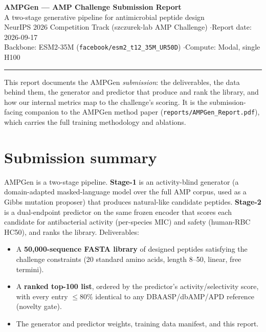 \documentclass[11pt]{article}
\begin{document}
\begin{center}
{\LARGE\bfseries AMPGen --- AMP Challenge Submission Report}\\[4pt]
{\large A two-stage generative pipeline for antimicrobial peptide design}\\[6pt]
{\normalsize NeurIPS 2026 Competition Track (szczurek-lab AMP Challenge) \quad$\cdot$\quad Report date: 2026-09-17}\\[2pt]
{\small Backbone: ESM2-35M (\texttt{facebook/esm2\_t12\_35M\_UR50D}) \quad$\cdot$\quad Compute: Modal, single H100}
\end{center}
\vspace{2pt}
\hrule
\vspace{6pt}

This report documents the AMPGen \emph{submission}: the deliverables, the data behind them, the
generator and predictor that produce and rank the library, and how our internal metrics map to the
challenge's scoring. It is the submission-facing companion to the AMPGen method paper
(\texttt{reports/AMPGen\_Report.pdf}), which carries the full training methodology and ablations.

\section{Submission summary}

AMPGen is a two-stage pipeline. \textbf{Stage-1} is an activity-blind generator (a domain-adapted
masked-language model over the full AMP corpus, used as a Gibbs mutation proposer) that produces
natural-like candidate peptides. \textbf{Stage-2} is a dual-endpoint predictor on the same frozen
encoder that scores each candidate for antibacterial activity (per-species MIC) and safety
(human-RBC HC50), and ranks the library. Deliverables:

\begin{itemize}\itemsep2pt
  \item A \textbf{50{,}000-sequence FASTA library} of designed peptides satisfying the challenge
        constraints (20 standard amino acids, length 8--50, linear, free termini).
  \item A \textbf{ranked top-100 list}, ordered by the predictor's activity/selectivity score, with
        every entry $\le 80\%$ identical to any DBAASP/dbAMP/APD reference (novelty gate).
  \item The generator and predictor weights, training data manifest, and this report.
\end{itemize}
\end{document}
